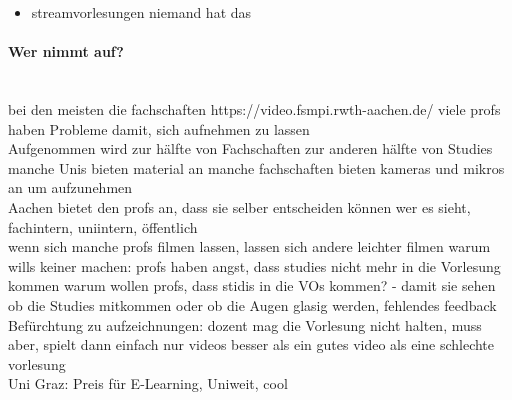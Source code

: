 \begin{itemize}
{\begin{itemize}
\begin{itemize}
			\item streamvorlesungen
			niemand hat das
		\end{itemize}

\paragraph{Wer nimmt auf?} \\
bei den meisten die fachschaften
https://video.fsmpi.rwth-aachen.de/
viele profs haben Probleme damit, sich aufnehmen zu lassen \\

Aufgenommen wird zur hälfte von Fachschaften zur anderen hälfte von Studies
manche Unis bieten material an
manche fachschaften bieten kameras und mikros an um aufzunehmen\\

Aachen bietet den profs an, dass sie selber entscheiden können wer es sieht, fachintern, uniintern, öffentlich\\

wenn sich manche profs filmen lassen, lassen sich andere leichter filmen
warum wills keiner machen:
profs haben angst, dass studies nicht mehr in die Vorlesung kommen
warum wollen profs, dass stidis in die VOs kommen? - damit sie sehen ob die Studies mitkommen oder ob die Augen glasig werden, fehlendes feedback\\

Befürchtung zu aufzeichnungen: dozent mag die Vorlesung nicht halten, muss aber, spielt dann einfach nur videos
besser als ein gutes video als eine schlechte vorlesung\\

Uni Graz: Preis für E-Learning, Uniweit, cool\\


\end{itemize}}
\end{itemize}
